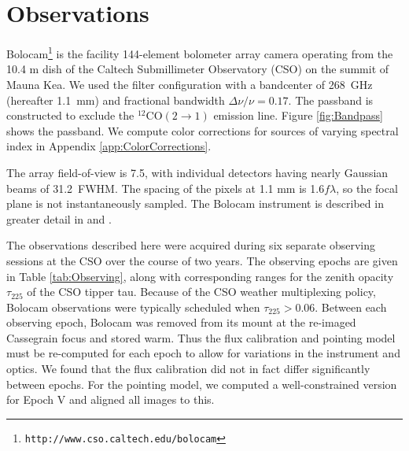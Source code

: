 \documentclass[12pt,preprint]{aastex}
\newcommand{\bcamfwhm}{31.2\arcsec}
\begin{document}
\clearpage

%
\section{Observations}
\label{sec:Observations}


Bolocam\footnote{{\tt http://www.cso.caltech.edu/bolocam}} is the
facility 144-element bolometer array camera operating from the 10.4 m
dish of the Caltech Submillimeter Observatory (CSO) on the summit of
Mauna Kea.  We used the filter configuration with a bandcenter of
268~GHz (hereafter 1.1~mm) and fractional bandwidth $\Delta \nu/\nu =
0.17$.  The passband is constructed to exclude the $^{12}\mathrm{CO}(2
\to 1)$ emission line.  Figure \ref{fig:Bandpass} shows the passband.
We compute color corrections for sources of varying spectral index in
Appendix \ref{app:ColorCorrections}.

The array field-of-view is 7\arcmin.5, with individual detectors
having nearly Gaussian beams of \bcamfwhm\ FWHM.  The spacing of the
pixels at 1.1 mm is 1.6$f\lambda$, so the focal plane is not
instantaneously sampled.  The Bolocam instrument is described in greater
detail in \citet{haig04} and \citet{glenn03}.


The observations described here were acquired during six separate
observing sessions at the CSO over the course of two years.  The
observing epochs are given in Table \ref{tab:Observing}, along with
corresponding ranges for the zenith opacity $\tau_{225}$ of the CSO
tipper tau.  Because of the CSO weather multiplexing policy, Bolocam
observations were typically scheduled when $\tau_{225} > 0.06$.
Between each observing epoch, Bolocam was removed from its mount at
the re-imaged Cassegrain focus and stored warm.  Thus the flux
calibration and pointing model must be re-computed for each epoch to
allow for variations in the instrument and optics.  We found that the
flux calibration did not in fact differ significantly between epochs.
For the pointing model, we computed a well-constrained version for
Epoch V and aligned all images to this.
\end{document}

